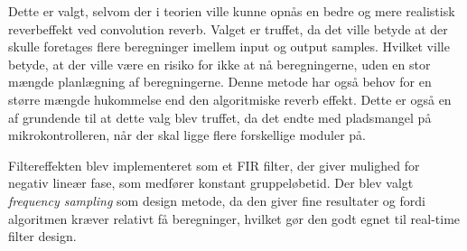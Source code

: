 Dette er valgt, selvom der i teorien ville kunne opnås en bedre og mere realistisk reverbeffekt ved convolution reverb.
Valget er truffet, da det ville betyde at der skulle foretages flere beregninger imellem input og output samples.
Hvilket ville betyde, at der ville være en risiko for ikke at nå beregningerne, uden en stor mængde planlægning af beregningerne.
Denne metode har også behov for en større mængde hukommelse end den algoritmiske reverb effekt.
Dette er også en af grundende til at dette valg blev truffet, da det endte med pladsmangel på mikrokontrolleren, når der skal ligge flere forskellige moduler på.

Filtereffekten blev implementeret som et FIR filter, der giver mulighed for negativ lineær fase, som medfører konstant gruppeløbetid.
Der blev valgt \textit{frequency sampling} som design metode, da den giver fine resultater og fordi algoritmen kræver relativt få beregninger, hvilket gør den godt egnet til real-time filter design.


